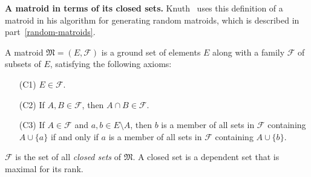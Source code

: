 \textbf{A matroid in terms of its closed sets.} Knuth \cite{knuth-1975} \cite{knuth-1975} uses this definition of a matroid in his algorithm for generating random matroids, which is described in part \ref{random-matroids}.

A matroid $\mathfrak{M} = (E, \mathcal{F})$ is a ground set of elements $E$ along with a family $\mathcal{F}$ of subsets of $E$, satisfying the following axioms:
\begin{itemize}
  \item [(C1)] $E \in \mathcal{F}$.
  \item [(C2)] If $A, B \in \mathcal{F}$, then $A \cap B \in \mathcal{F}$.
  \item [(C3)] If $A \in \mathcal{F}$ and $a,b \in E \setminus A$, then $b$ is a member of all sets in $\mathcal{F}$ containing $A \cup \{a\}$ if and only if $a$ is a member of all sets in $\mathcal{F}$ containing $A \cup \{b\}$.
\end{itemize}

$\mathcal{F}$ is the set of all \textit{closed sets} of $\mathfrak{M}$. A closed set is a dependent set that is maximal for its rank.

\skelpar